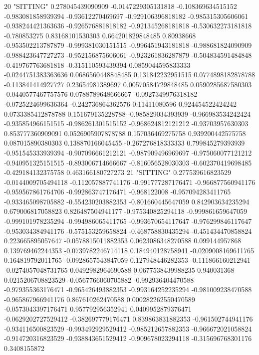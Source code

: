 20 "SITTING" 0.278045439090909 -0.0147229305131818 -0.108369634515152 -0.983081858939394 -0.93612270469697 -0.929106396818182 -0.985315305606061 -0.938244421363636 -0.926576881818182 -0.921345268181818 -0.530632273181818 -0.780853275 0.83168101530303 0.664201829848485 0.80938668 -0.953502213787879 -0.999381030151515 -0.996451943181818 -0.988681824090909 -0.988423647727273 -0.952156875606061 -0.923261836287879 -0.504834591484848 -0.419767763681818 -0.315110593439394 0.0859044595833333 -0.0244751383363636 0.0686560448848485 0.131842232951515 0.0774898182878788 -0.113841414927727 0.23654981389697 0.00570584729848485 0.0590285687580303 -0.0440577467757576 0.0788789648666667 -0.0927349976318182 -0.0725224699636364 -0.242736864362576 0.11411080596 0.924454522424242 0.0733385412878788 0.151679135228788 -0.985829034393939 -0.966983534242424 -0.935854966151515 -0.986261301515152 -0.968624812121212 -0.93703957630303 0.853777360909091 0.0526905907878788 0.157036469275758 0.939200442575758 0.087015890380303 0.138870166045455 -0.267276818333333 0.799845279393939 -0.951545333939394 -0.907096661212121 -0.987909496969697 -0.975060077121212 -0.940951325151515 -0.893006714666667 -0.816056528030303 -0.602370419698485 -0.429184132375758 0.463166180727273
21 "SITTING" 0.277539616823529 -0.0144009705494118 -0.112057887741176 -0.991777287176471 -0.966877560941176 -0.959567861764706 -0.992863747176471 -0.968122008 -0.957094283411765 -0.933465098705882 -0.554230203882353 -0.801660445647059 0.842903634235294 0.679006817058823 0.826487504941177 -0.975340825294118 -0.999861659647059 -0.999101978235294 -0.994986065411765 -0.993670654117647 -0.976299846117647 -0.953034384941176 -0.575153259658824 -0.468758830435294 -0.451434470858824 0.223665895057647 -0.0578815011882353 0.0623086348270588 0.099144957868 0.139769462244353 -0.0739782246714118 0.184940128758941 -0.0209008169611765 0.164819792011765 -0.0928657543847059 0.127948446282353 -0.111866160212941 -0.0274057048731765 0.0492982964690588 0.0677538439988235 0.940031368 0.0215206708823529 -0.0567766060705882 -0.992936404470588 -0.979355363176471 -0.965426493882353 -0.993164252235294 -0.981009238470588 -0.965867966941176 0.867610262470588 0.000282262550470589 -0.0573043397176471 0.957792956352941 0.0409952879376471 -0.0629202727529412 -0.382697779176471 0.839863831882353 -0.961502744941176 -0.934116500823529 -0.993492929529412 -0.985212657882353 -0.966672021058824 -0.914720316823529 -0.938843651529412 -0.909678023294118 -0.315696768301176 0.3408155872

